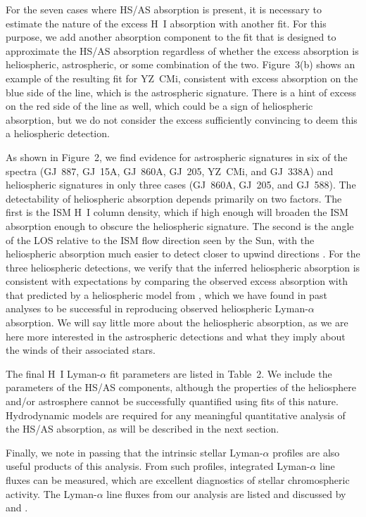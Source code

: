 \documentclass[preprint]{aastex}
\begin{document}
     For the seven cases where HS/AS absorption is present,
it is necessary to estimate the nature of the excess H~I
absorption with another fit.  For this purpose, we
add another absorption component to the fit that is designed
to approximate the HS/AS absorption regardless of whether
the excess absorption is heliospheric, astrospheric, or some
combination of the two.  Figure~3(b) shows an example of the
resulting fit for YZ~CMi, consistent with excess absorption
on the blue side of the line, which is the astrospheric
signature.  There is a hint of excess on the red side of the
line as well, which could be a sign of heliospheric absorption,
but we do not consider the excess sufficiently convincing to
deem this a heliospheric detection.

     As shown in Figure~2, we find evidence for
astrospheric signatures in six of the spectra (GJ~887, GJ~15A,
GJ~860A, GJ~205, YZ~CMi, and GJ~338A) and heliospheric
signatures in only three cases (GJ~860A, GJ~205, and GJ~588).
The detectability of heliospheric absorption depends primarily
on two factors.  The first is the ISM H~I column density, which
if high enough will broaden the ISM absorption enough to obscure
the heliospheric signature.  The second is the angle of the LOS
relative to the ISM flow direction seen by the Sun, with the 
heliospheric absorption much easier to detect closer to upwind
directions \citep{bew05b}.  For the three heliospheric
detections, we verify that the inferred heliospheric absorption
is consistent with expectations by comparing the
observed excess absorption with that predicted by a
heliospheric model from \citet{bew00}, which we have
found in past analyses to be successful in reproducing observed
heliospheric Lyman-$\alpha$ absorption.  We will say little
more about the heliospheric absorption, as we are here
more interested in the astrospheric detections and what they
imply about the winds of their associated stars.

     The final H~I Lyman-$\alpha$ fit parameters are listed
in Table~2.  We include the parameters of the HS/AS components,
although the properties of the heliosphere and/or astrosphere cannot
be successfully quantified using fits of this nature.
Hydrodynamic models are required for any meaningful quantitative
analysis of the HS/AS absorption, as will be described in
the next section.

     Finally, we note in passing that the intrinsic stellar
Lyman-$\alpha$ profiles are also useful products
of this analysis.  From such profiles, integrated
Lyman-$\alpha$ line fluxes can be measured, which are
excellent diagnostics of stellar chromospheric activity.
The Lyman-$\alpha$ line fluxes from our analysis
are listed and discussed by \citet{km20} and \citet{jll20}.
\end{document}
